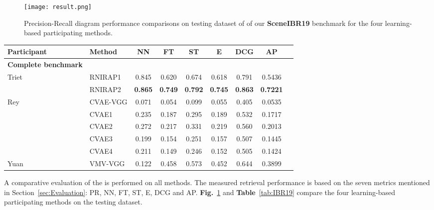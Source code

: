 \documentclass[../main.tex]{subfiles}
\begin{document}
\begin{figure}[!htp]
	\centering
	{
		\texttt{[image: result.png]}
	}
	\caption{ Precision-Recall diagram performance comparisons on testing dataset of of our \textbf{SceneIBR19} benchmark for the four learning-based participating methods.}
	\label{Results}
\end{figure}



\begin{table*}[!htb]
	\centering
	\caption{Performance metrics comparison on the SHREC'19 SceneIBR Track Benchmark.}
	\label{tab:IBR19}
	\begin{tabular}{llccccccc}
		\hline		
		\normalsize {\textbf{Participant}}	&\normalsize {\textbf{Method}} &\normalsize {\textbf{NN}}  &\normalsize {\textbf{FT}} &\normalsize {\textbf{ST}} &\normalsize {\textbf{E}} &\normalsize {\textbf{DCG}} &\normalsize {\textbf{AP}}\\
		\hline
		\textbf{\normalsize{Complete benchmark}}\\
		\hline
		\multirow{2}{*}{Triet} &RNIRAP1 &0.845    &0.620   &0.674   &0.618   &0.791  &  0.5436\\	
		\cline{2-8}
		&RNIRAP2 &\textbf{0.865}    &\textbf{0.749}   &\textbf{0.792}   &\textbf{0.745}   &\textbf{0.863} &\textbf{0.7221}\\	
		\hline  		 									
		\multirow{5}{*}{Rey} &CVAE-VGG &0.071    &0.054   &0.099   &0.055   &0.405 &0.0535\\ \cline{2-8}&CVAE1  &0.235    &0.187   &0.295   &0.189   &0.532 &0.1717\\
		\cline{2-8}
		&CVAE2 &0.272    &0.217   &0.331   &0.219   &0.560  &0.2013\\
		\cline{2-8}
		&CVAE3 &0.199    &0.154   &0.251   &0.157   &0.507 &0.1445\\
		\cline{2-8}
		&CVAE4 &0.211    &0.149   &0.246   &0.152   &0.505  &0.1424\\
		\hline							
		Yuan &VMV-VGG &0.122	 &0.458	 &0.573	 &0.452	 &0.644 &0.3899\\			
		\hline		
	\end{tabular}
\end{table*}

A comparative evaluation of the is performed on all methods. The measured retrieval performance is based on the seven metrics mentioned in Section~\ref{sec:Evaluation}: PR, NN, FT, ST, E, DCG and AP. \textbf{Fig.}~\ref{Results} and \textbf{Table}~\ref{tab:IBR19} compare the four learning-based participating methods on the testing dataset.
\end{document}
